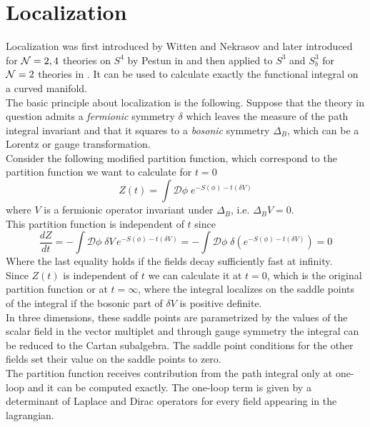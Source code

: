 \section{Localization}
Localization was first introduced by Witten \cite{Witten:1992xu} and Nekrasov \cite{Nekrasov:2002qd} and later introduced  for $\mathcal{N}=2,4$ theories on  $S^4$ by Pestun in \cite{Pestun:2007rz} and then applied to $S^3$ and $S_b^3$ for $\mathcal{N}=2$ theories in \cite{Kapustin:2009kz,Hama:2010av,Hama:2011ea}.
It can be used to calculate exactly the functional integral on a curved manifold.\\
The basic principle about localization is the following.
Suppose that the theory in question admits a \emph{fermionic} symmetry $\delta$ which leaves the measure of the path integral invariant and that it squares to a \emph{bosonic} symmetry $\Delta_B$, which can be a Lorentz or gauge transformation.\\
Consider the following modified partition function, which correspond to the partition function we want to calculate for $t=0$
\begin{equation}
Z(t) = \int \mathcal{D} \phi \; e^{- S(\phi) - t (\delta V)}
\end{equation}
where $V$ is a fermionic operator invariant under $\Delta_B$, i.e. $ \Delta_B V = 0$.\\
This partition function is independent of $t$ since
\begin{equation}
 \frac{d Z}{d t} = - \int \mathcal{D} \phi \; \delta V \, e^{- S(\phi) - t (\delta V)} =  - \int  \mathcal{D} \phi \; \delta \left( e^{- S(\phi) - t (\delta V)  }\right) = 0
\end{equation}
Where the last equality holds if the fields decay sufficiently fast at infinity.\\
Since $Z(t)$ is independent of $t$ we can calculate it at $t=0$, which is the original partition function or at $t=\infty$, where the integral localizes on the saddle points of the integral if the bosonic part of $\delta V$ is positive definite.\\
In three dimensions, these saddle points are parametrized by the values of the scalar field in the vector multiplet and through gauge symmetry the integral can be reduced to the Cartan subalgebra. 
The saddle point conditions for the other fields set their value on the saddle points to zero.\\
The partition function receives contribution from the path integral only at one-loop and it can be computed exactly.
The one-loop term is given by a determinant of Laplace and Dirac operators for every field appearing in the lagrangian.
